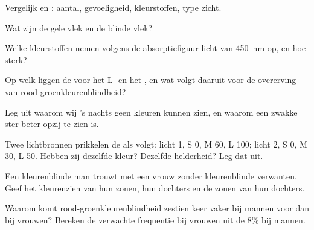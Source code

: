 \begin{exercise}[$\star$]\label{exo:g11:the-eye:2}
Vergelijk  en : aantal, gevoeligheid, kleurstoffen,
type zicht.
\end{exercise}

\begin{exercise}[$\star$]\label{exo:g11:the-eye:3}
Wat zijn de gele vlek en de blinde vlek?
\end{exercise}

\begin{exercise}[$\star$]\label{exo:g11:the-eye:4}
Welke kleurstoffen nemen volgens de absorptiefiguur licht van
\qty{450}{nm} op, en hoe sterk?
\end{exercise}

\begin{exercise}[$\star$]\label{exo:g11:the-eye:5}
Op welk  liggen de  voor het L- en het , en wat
volgt daaruit voor de overerving van rood-groenkleurenblindheid?
\end{exercise}

\begin{exercise}[$\star\star$]\label{exo:g11:the-eye:6}
Leg uit waarom wij 's nachts geen kleuren kunnen zien, en waarom een
zwakke ster beter opzij te zien is.
\end{exercise}

\begin{exercise}[$\star\star$]\label{exo:g11:the-eye:7}
Twee lichtbronnen prikkelen de  als volgt: licht 1, S 0, M 60,
L 100; licht 2, S 0, M 30, L 50. Hebben zij dezelfde kleur? Dezelfde
helderheid? Leg dat uit.
\end{exercise}

\begin{exercise}[$\star\star$]\label{exo:g11:the-eye:8}
Een kleurenblinde man trouwt met een vrouw zonder kleurenblinde
verwanten. Geef het kleurenzien van hun zonen, hun dochters en de zonen
van hun dochters.
\end{exercise}

\begin{exercise}[$\star\star$]\label{exo:g11:the-eye:9}
Waarom komt rood-groenkleurenblindheid zestien keer vaker bij mannen voor
dan bij vrouwen? Bereken de verwachte frequentie bij vrouwen uit de 8\%
bij mannen.
\end{exercise}

